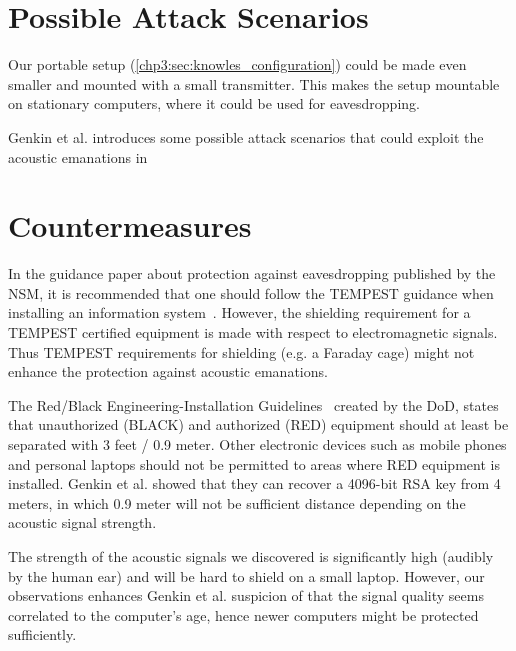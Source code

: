 \section{Possible Attack Scenarios}\label{chp6:sec:attack_scenarios}

Our portable setup (\autoref{chp3:sec:knowles_configuration}) could be made even smaller and mounted with a small transmitter. 
This makes the setup mountable on stationary computers, where it could be used for eavesdropping. 

Genkin et al. introduces some possible attack scenarios that could exploit the acoustic emanations in~\cite[Section 1.2 and Appendix B]{DBLP:journals/iacr/GenkinST13}

\section{Countermeasures}\label{chp6:sec:countermeasures}

In the guidance paper about protection against eavesdropping published by the \gls{NSM}, it is recommended that one should follow the TEMPEST guidance when installing an information system~\cite[Section 9.8, page 7]{url:NSM/avlytting}.
However, the shielding requirement for a TEMPEST certified equipment is made with respect to electromagnetic signals.
Thus TEMPEST requirements for shielding (e.g. a Faraday cage) might not enhance the protection against acoustic emanations. 

The Red/Black Engineering-Installation Guidelines~\cite[Section 30.1, page 91]{url:Red/Black/Engineering} created by the \gls{DoD}, states that unauthorized (BLACK) and authorized (RED) equipment should at least be separated with 3 feet / 0.9 meter. 
Other electronic devices such as mobile phones and personal laptops should not be permitted to areas where RED equipment is installed. 
Genkin et al. showed that they can recover a 4096-bit RSA key from 4 meters, in which 0.9 meter will not be sufficient distance depending on the acoustic signal strength. 

The strength of the acoustic signals we discovered is significantly high (audibly by the human ear) and will be hard to shield on a small laptop.
However, our observations enhances Genkin et al. suspicion of that the signal quality seems correlated to the computer's age, hence newer computers might be protected sufficiently. 


